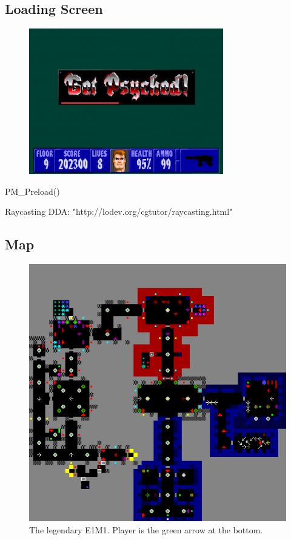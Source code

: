 \subsection{Loading Screen}
\begin{figure}[H]
  \centering
 \includegraphics[scale=1.3]{imgs/get_psyched.png}
\end{figure}
PM\_Preload()

Raycasting DDA: "http://lodev.org/cgtutor/raycasting.html"

\subsection{Map}
\begin{figure}[H]
  \centering
 \includegraphics[scale=1.0]{imgs/e1m1.png}
 \caption{The legendary E1M1. Player is the green arrow at the bottom.}
\end{figure}

